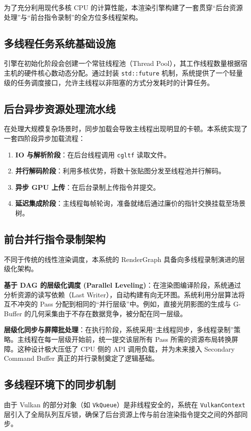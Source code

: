 为了充分利用现代多核 CPU 的计算性能，本渲染引擎构建了一套贯穿“后台资源处理”与“前台指令录制”的全方位多线程架构。

\subsection{多线程任务系统基础设施}
引擎在初始化阶段会创建一个常驻线程池（Thread Pool），其工作线程数量根据宿主机的硬件核心数动态分配。通过封装 \texttt{std::future} 机制，系统提供了一个轻量级的任务调度接口，允许主线程以非阻塞的方式分发耗时的计算任务。

\subsection{后台异步资源处理流水线}
在处理大规模复杂场景时，同步加载会导致主线程出现明显的卡顿。本系统实现了一套四阶段异步加载流程：
\begin{enumerate}
    \item \textbf{IO 与解析阶段}：在后台线程调用 \texttt{cgltf} 读取文件。
    \item \textbf{并行解码阶段}：利用多核优势，将数十张贴图分发至线程池并行解码。
    \item \textbf{异步 GPU 上传}：在后台录制上传指令并提交。
    \item \textbf{延迟集成阶段}：主线程每帧轮询，准备就绪后通过廉价的指针交换挂载至场景树。
\end{enumerate}

\subsection{前台并行指令录制架构}
不同于传统的线性渲染调度，本系统的 RenderGraph 具备向多线程录制演进的层级化架构。

\textbf{基于 DAG 的层级化调度 (Parallel Leveling)}：在渲染图编译阶段，系统通过分析资源的读写依赖（Last Writer），自动构建有向无环图。系统利用分层算法将互不冲突的 Pass 分配到相同的“并行层级”中。例如，直接光阴影图的生成与 G-Buffer 的几何采集由于不存在数据竞争，被分配在同一层级。

\textbf{层级化同步与屏障批处理}：在执行阶段，系统采用“主线程同步，多线程录制”策略。主线程在每一层级开始前，统一提交该层所有 Pass 所需的资源布局转换屏障。这种设计极大压低了 CPU 侧的 API 调用负载，并为未来接入 Secondary Command Buffer 真正的并行录制奠定了逻辑基础。

\subsection{多线程环境下的同步机制}
由于 Vulkan 的部分对象（如 \texttt{VkQueue}）是非线程安全的，系统在 \texttt{VulkanContext} 层引入了全局队列互斥锁，确保了后台资源上传与前台渲染指令提交之间的外部同步。

